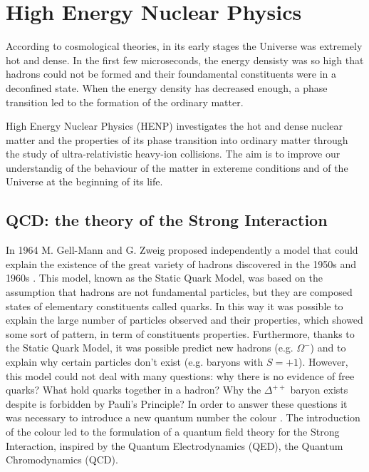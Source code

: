 %
\chapter{High Energy Nuclear Physics}
\label{sec:1}


According to cosmological theories, in its early stages the Universe was extremely hot and dense.
In the first few microseconds, the energy densisty was so high that hadrons could not be formed and
their foundamental constituents were in a deconfined state. When the energy density has decreased
enough, a phase transition led to the formation of the ordinary matter. 

High Energy Nuclear Physics (HENP) investigates the hot and dense nuclear matter and the properties
of its phase transition into ordinary matter through the study of ultra-relativistic heavy-ion collisions. 
The aim is to improve our understandig of the behaviour of the matter in extereme conditions and of the
Universe at the beginning of its life.

\section{QCD: the theory of the Strong Interaction}
\label{sec:1.1}

In 1964 M. Gell-Mann and G. Zweig proposed independently a model that could explain the existence of
the great variety of hadrons discovered in the 1950s and 1960s 
\cite{gellmann, zweig1, zweig2}. 
This model, known as the Static Quark Model, was based on the assumption that hadrons are not
fundamental particles, but they are composed states of elementary constituents called quarks.
In this way it was possible to explain the large number of particles observed and their properties,
which showed some sort of pattern, in term of constituents properties.
Furthermore, thanks to the Static Quark Model, it was possible predict new hadrons (e.g. 
$\Omega^{-}\xspace$) and to explain why certain particles don't exist (e.g. baryons with $S=+1$).
However, this model could not deal with many questions: why there is no evidence of free quarks?
What hold quarks together in a hadron? Why the $\Delta^{++}$ baryon exists despite is forbidden
by Pauli's Principle?
In order to answer these questions it was necessary to introduce a new quantum number the colour
\cite{fritzsch-gellmann}. The introduction of the colour led to the formulation of a quantum field theory
for the Strong Interaction, inspired by the Quantum Electrodynamics (QED), the Quantum Chromodynamics
(QCD).

